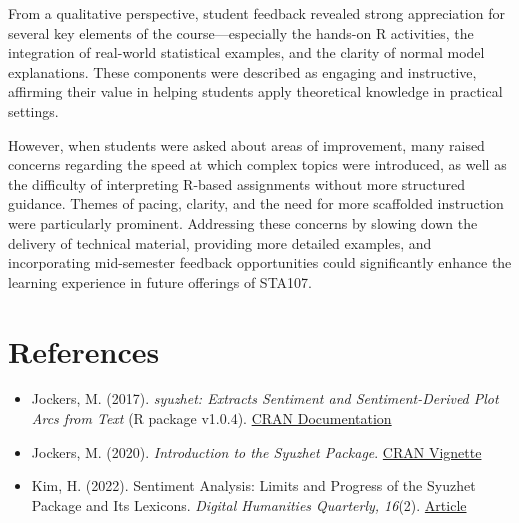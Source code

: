 \documentclass[
  letterpaper,
  DIV=11,
  numbers=noendperiod]{scrartcl}
\begin{document}
From a qualitative perspective, student feedback revealed strong
appreciation for several key elements of the course---especially the
hands-on R activities, the integration of real-world statistical
examples, and the clarity of normal model explanations. These components
were described as engaging and instructive, affirming their value in
helping students apply theoretical knowledge in practical settings.

However, when students were asked about areas of improvement, many
raised concerns regarding the speed at which complex topics were
introduced, as well as the difficulty of interpreting R-based
assignments without more structured guidance. Themes of pacing, clarity,
and the need for more scaffolded instruction were particularly
prominent. Addressing these concerns by slowing down the delivery of
technical material, providing more detailed examples, and incorporating
mid-semester feedback opportunities could significantly enhance the
learning experience in future offerings of STA107.

\section{References}\label{references}

\begin{itemize}
\item
  Jockers, M. (2017). \emph{syuzhet: Extracts Sentiment and
  Sentiment-Derived Plot Arcs from Text} (R package v1.0.4).
  \href{https://cran.r-project.org/web/packages/syuzhet/index.html}{CRAN
  Documentation}
\item
  Jockers, M. (2020). \emph{Introduction to the Syuzhet Package}.
  \href{https://cran.r-project.org/web/packages/syuzhet/vignettes/syuzhet-vignette.html}{CRAN
  Vignette}
\item
  Kim, H. (2022). Sentiment Analysis: Limits and Progress of the Syuzhet
  Package and Its Lexicons. \emph{Digital Humanities Quarterly, 16}(2).
  \href{http://www.digitalhumanities.org/dhq/vol/16/2/000601/000601.html}{Article}
\end{itemize}
\end{document}
